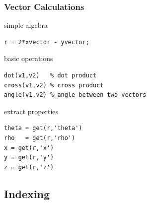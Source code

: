 \documentclass[compress]{beamer}
\begin{document}
\begin{frame}[fragile]
  \frametitle{Vector Calculations}

  simple algebra
\begin{lstlisting}[style=input]
r = 2*xvector - yvector;
\end{lstlisting}

  \pause \medskip


  basic operations
\begin{lstlisting}[style=input]
dot(v1,v2)   % dot product
cross(v1,v2) % cross product
angle(v1,v2) % angle between two vectors
\end{lstlisting}

  \pause \medskip

  extract properties
\begin{lstlisting}[style=input]
theta = get(r,'theta')
rho   = get(r,'rho')
x = get(r,'x')
y = get(r,'y')
z = get(r,'z')
\end{lstlisting}

\end{frame}


\subsection*{Indexing}
\end{document}

